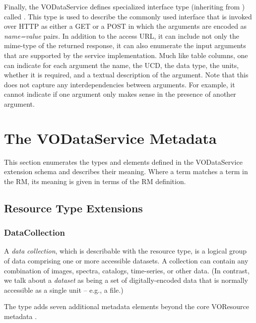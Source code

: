 \documentclass[11pt,a4paper]{ivoa}
\begin{document}
Finally, the VODataService defines specialized interface type
(inheriting from ) called
.  This type is used to describe the commonly
used interface that is invoked over HTTP as either a GET or a POST 
\citep{HTTP} in which the arguments are encoded as
\emph{name=value} pairs.  In addition to the access URL, it can
include not only the mime-type of the returned response, it can also
enumerate the input arguments that are supported by the service
implementation.  Much like table columns, one can indicate for each
argument the name, the UCD, the data type, the units, whether it is
required, and a textual description of the argument.  Note that this does
not capture any interdependencies between arguments.  For example, it
cannot indicate if one argument only makes sense in the presence of
another argument.  


\section{The VODataService Metadata}
\label{sect:metadata}


This section enumerates the types and elements defined in the
VODataService extension schema and describes their meaning.  Where a
term matches a term in the RM, its meaning is given
in terms of the RM definition.  


\subsection{Resource Type Extensions}
\label{sect:resext}

\subsubsection{DataCollection}
\label{sect:datacollection}


A \emph{data collection}, which is describable with the
 resource type, is a logical
group of data comprising one or more accessible
datasets.  A collection can contain any combination of images,
spectra, catalogs, time-series, or other data.  (In contrast, we talk
about a \emph{dataset} as being a set of digitally-encoded
data that is normally accessible as a single unit -- e.g., a file.)



The  type adds seven additional metadata
elements beyond the core VOResource metadata \citep{VOR}.  
\end{document}
